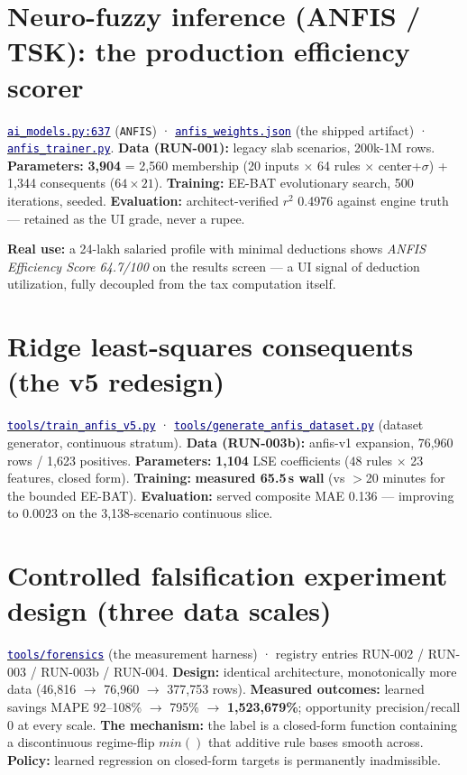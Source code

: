 \documentclass[11pt,a4paper]{article}
\newcommand{\code}[2]{\href{https://github.com/Jayant1711/Tax_Assist-system/blob/v0.7-sprint7/#1}{\texttt{\textcolor{navy}{#2}}}}
\newcommand{\facts}[1]{{\small\textcolor{muted}{#1}\par}}
\begin{document}
\section{Neuro-fuzzy inference (ANFIS / TSK): the production efficiency scorer}
\facts{\code{backend/ai\_models.py}{ai\_models.py:637} (\texttt{ANFIS}) ·
\code{backend/anfis\_weights.json}{anfis\_weights.json} (the shipped artifact) ·
\code{backend/anfis\_trainer.py}{anfis\_trainer.py}. \textbf{Data (RUN-001):}
legacy slab scenarios, 200k-1M rows. \textbf{Parameters:} \textbf{3,904} =
2,560 membership (20 inputs $\times$ 64 rules $\times$ center+$\sigma$) + 1,344
consequents ($64 \times 21$). \textbf{Training:} EE-BAT evolutionary search, 500
iterations, seeded. \textbf{Evaluation:} architect-verified $r^2$ 0.4976 against
engine truth --- retained as the UI grade, never a rupee.}

\begin{examplebox}
\textbf{Real use:} a 24-lakh salaried profile with minimal deductions shows
\emph{ANFIS Efficiency Score 64.7/100} on the results screen --- a UI signal of
deduction utilization, fully decoupled from the tax computation itself.
\end{examplebox}

\section{Ridge least-squares consequents (the v5 redesign)}
\facts{\code{backend/tools/train\_anfis\_v5.py}{tools/train\_anfis\_v5.py} ·
\code{backend/tools/generate\_anfis\_dataset.py}{tools/generate\_anfis\_dataset.py}
(dataset generator, continuous stratum). \textbf{Data (RUN-003b):} anfis-v1
expansion, 76,960 rows / 1,623 positives. \textbf{Parameters:} \textbf{1,104}
LSE coefficients ($48$ rules $\times$ 23 features, closed form). \textbf{Training:}
\textbf{measured 65.5\,s wall} (vs $>$20 minutes for the bounded EE-BAT).
\textbf{Evaluation:} served composite MAE 0.136 --- improving to 0.0023 on the
3,138-scenario continuous slice.}

\section{Controlled falsification experiment design (three data scales)}
\facts{\code{backend/tools/forensics/}{tools/forensics} (the measurement
harness) · registry entries RUN-002 / RUN-003 / RUN-003b / RUN-004.
\textbf{Design:} identical architecture, monotonically more data (46,816
$\rightarrow$ 76,960 $\rightarrow$ 377,753 rows). \textbf{Measured outcomes:}
learned savings MAPE 92--108\% $\rightarrow$ 795\% $\rightarrow$
\textbf{1,523,679\%}; opportunity precision/recall 0 at every scale. \textbf{The
mechanism:} the label is a closed-form function containing a discontinuous
regime-flip $min()$ that additive rule bases smooth across. \textbf{Policy:}
learned regression on closed-form targets is permanently inadmissible.}
\end{document}

